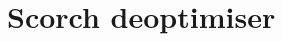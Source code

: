 \documentclass[a4paper,12pt,twoside]{../includes/ThesisStyle}
\begin{document}









\section{Scorch deoptimiser}
\end{document}
